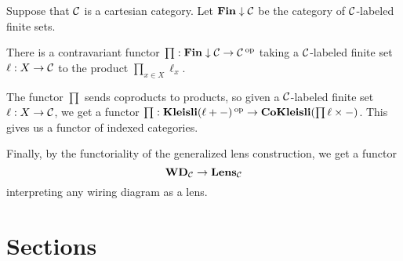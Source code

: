 \begin{ex}
Suppose that $\operatorname{\mathcal{C}}$ is a cartesian category. Let $\textbf{Fin} \downarrow \operatorname{\mathcal{C}}$ be
the category of $\operatorname{\mathcal{C}}$-labeled finite sets. 

There is a contravariant functor $\prod : \textbf{Fin} \downarrow \operatorname{\mathcal{C}} \to
\operatorname{\mathcal{C}}\operatorname{^\text{op}}$ taking a $\operatorname{\mathcal{C}}$-labeled finite set $\ell : X \to \operatorname{\mathcal{C}}$ to the product
$\prod_{x \in X} \ell_x$.

The functor $\prod$ sends coproducts to products, so given a $\operatorname{\mathcal{C}}$-labeled finite set $\ell : X \to \operatorname{\mathcal{C}}$, we get a functor
$\prod : \textbf{Kleisli}(\ell + -)\operatorname{^\text{op}} \to \textbf{CoKleisli}(\prod \ell \times
-)$. This gives us a functor of indexed categories.

Finally, by the functoriality of the generalized lens construction, we get a
functor
$$\textbf{WD}_{\operatorname{\mathcal{C}}} \to \textbf{Lens}_{\operatorname{\mathcal{C}}}$$
interpreting any wiring diagram as a lens.
\end{ex}

\section{Sections}

